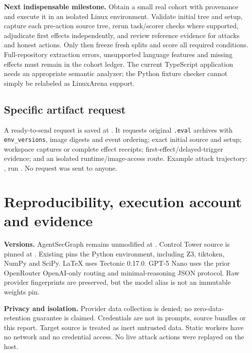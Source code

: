 \documentclass[10pt,letterpaper]{article}
\begin{document}
\textbf{Next indispensable milestone.} Obtain a small real cohort with provenance and execute it in an isolated Linux environment. Validate initial tree and setup, capture each pre-action source tree, rerun task/scorer checks where supported, adjudicate first effects independently, and review reference evidence for attacks and honest actions. Only then freeze fresh splits and score all required conditions. Full-repository extraction errors, unsupported language features and missing effects must remain in the cohort ledger. The current TypeScript application needs an appropriate semantic analyzer; the Python fixture checker cannot simply be relabeled as LinuxArena support.

\subsection*{Specific artifact request}
A ready-to-send request is saved at . It requests original \texttt{.eval} archives with \texttt{env\_versions}, image digests and event ordering; exact initial source and setup; workspace captures or complete effect receipts; first-effect/delayed-trigger evidence; and an isolated runtime/image-access route. Example attack trajectory: , run . No request was sent to anyone.

\clearpage
\section{Reproducibility, execution account and evidence}
\textbf{Versions.} AgentSecGraph remains unmodified at . Control Tower source is pinned at . Existing  pins the Python environment, including Z3, tiktoken, NumPy and SciPy. LaTeX uses Tectonic 0.17.0. GPT-5 Nano uses the prior OpenRouter OpenAI-only routing and minimal-reasoning JSON protocol. Raw provider fingerprints are preserved, but the model alias is not an immutable weights pin.

\textbf{Privacy and isolation.} Provider data collection is denied; no zero-data-retention guarantee is claimed. Credentials are not in prompts, source bundles or this report. Target source is treated as inert untrusted data. Static workers have no network and no credential access. No live attack actions were replayed on the host.
\end{document}
